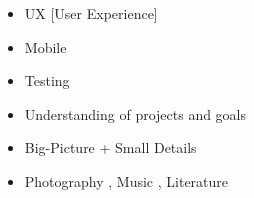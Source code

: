 

\begin{itemize}
 \setlength\itemsep{-0.3em}
 \item UX [User Experience]
   \item Mobile
   \item Testing
 \item Understanding of projects and goals
 \item Big-Picture + Small Details
 \item Photography%
,
Music%
,
Literature

\end{itemize}


